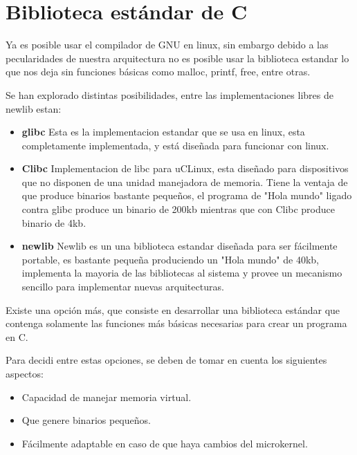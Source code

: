 \section{Biblioteca estándar de C}


Ya es posible usar el compilador de GNU en linux, sin embargo debido a las pecularidades de nuestra arquitectura no es posible usar la biblioteca estandar lo que nos deja sin funciones b\'asicas como malloc, printf, free, entre otras.

Se han explorado distintas posibilidades, entre las implementaciones libres de newlib estan:

\begin{itemize}

\item \textbf{glibc} Esta es la implementacion estandar que se usa en linux, esta completamente implementada, y est\'a dise\~nada para funcionar con linux.

\item \textbf{Clibc} Implementacion de libc para uCLinux, esta dise\~nado para dispositivos que no disponen de una unidad manejadora de memoria. Tiene la ventaja de que produce binarios bastante peque\~nos, el programa de "Hola mundo" ligado contra glibc produce un binario de 200kb mientras que con Clibc produce binario de 4kb.

\item \textbf{newlib} Newlib es un una biblioteca estandar dise\~nada para ser f\'acilmente portable, es bastante peque\~na produciendo un "Hola mundo" de 40kb, implementa la mayoria de las bibliotecas al sistema y provee un mecanismo sencillo para implementar nuevas arquitecturas.

\end{itemize}

Existe una opci\'on m\'as, que consiste en desarrollar una biblioteca est\'andar que contenga solamente las funciones m\'as b\'asicas necesarias para crear un programa en C.

Para decidi entre estas opciones, se deben de tomar en cuenta los siguientes aspectos:

\begin{itemize}

\item Capacidad de manejar memoria virtual.
\item Que genere binarios peque\~nos.
\item F\'acilmente adaptable en caso de que haya cambios del microkernel.

\end{itemize}

